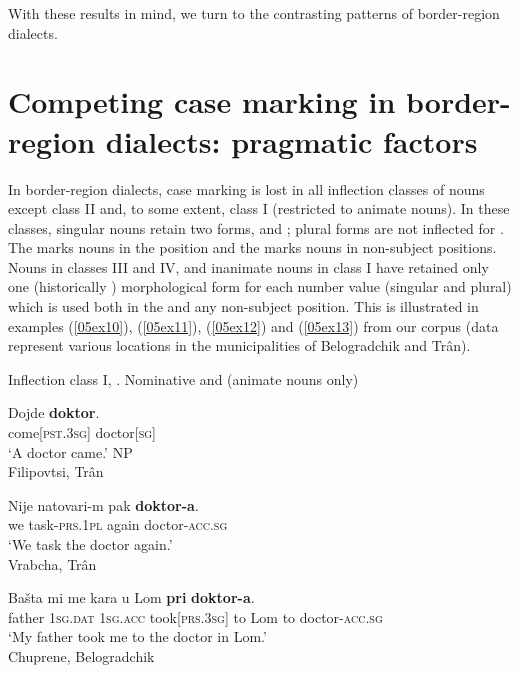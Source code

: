 \documentclass[output=paper,colorlinks,citecolor=brown]{langscibook}
\begin{document}
With these results in mind, we turn to the contrasting patterns of  border-region dialects.

\section{Competing case marking in  border-region dialects: pragmatic factors} \label{05sec4}

In  border-region dialects, case marking is lost in all inflection classes of nouns except class II and, to some extent, class I (restricted to animate nouns). In these classes, singular nouns retain two  forms,  and ; plural forms are not inflected for . The  marks nouns in the  position and the  marks nouns in non-subject positions. Nouns in classes III and IV, and inanimate nouns in class I have retained only one (historically ) morphological form for each number value (singular and plural) which is used both in the  and any non-subject position. This is illustrated in examples (\ref{05ex10}), (\ref{05ex11}), (\ref{05ex12}) and (\ref{05ex13}) from our corpus (data represent various locations in the municipalities of Belogradchik and Trân).

\medskip

Inflection class I, . Nominative and  (animate nouns only)

\begin{exe}
	\ex \label{05ex10}
	\begin{xlist}
		\ex 
		\gll Dojde \textbf{doktor}. \\
		come[\textsc{pst.3sg}] doctor[\textsc{sg}] \\
		\trans ‘A doctor came.’ \hfill {} NP \\
		\hfill Filipovtsi, Trân
		
		\ex 
		\gll Nije natovari-m pak \textbf{doktor-a}. \\
		we task-\textsc{prs.1pl} again doctor-\textsc{acc.sg} \\
		\trans ‘We task the doctor again.’ \\
		\hfill Vrabcha, Trân
		
		\ex 
		\gll Bašta mi me kara u Lom \textbf{pri} \textbf{doktor-a}. \\
		father \textsc{1sg.dat} \textsc{1sg.acc} took[\textsc{prs.3sg}] to Lom to doctor-\textsc{acc.sg} \\
		\trans ‘My father took me to the doctor in Lom.’ \\
		\hfill Chuprene, Belogradchik
	\end{xlist}
\end{exe}
\end{document}
